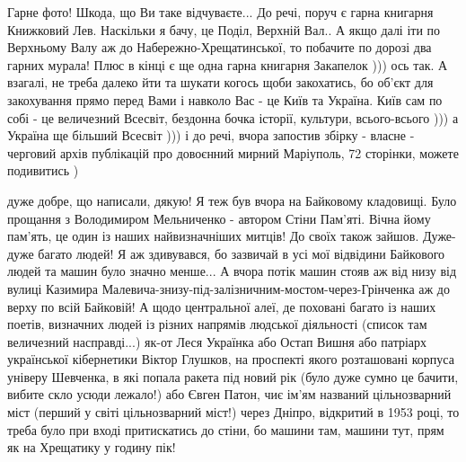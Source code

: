 Гарне фото! Шкода, що Ви таке відчуваєте... До речі, поруч є гарна книгарня
Книжковий Лев. Наскільки я бачу, це Поділ, Верхній Вал.. А якщо далі іти по
Верхньому Валу аж до Набережно-Хрещатинської, то побачите по дорозі два гарних
мурала! Плюс в кінці є ще одна гарна книгарня Закапелок ))) ось так. А взагалі,
не треба далеко йти та шукати когось щоби закохатись, бо об'єкт для закохування
прямо перед Вами і навколо Вас - це Київ та Україна. Київ сам по собі - це
величезний Всесвіт, бездонна бочка історії, культури, всього-всього ))) а
Україна ще більший Всесвіт ))) і до речі, вчора запостив збірку - власне -
черговий архів публікацій про довоєнний мирний Маріуполь, 72 сторінки, можете
подивитись )


дуже добре, що написали, дякую! Я теж був вчора на Байковому кладовищі. Було
прощання з Володимиром Мельниченко - автором Стіни Пам'яті. Вічна йому пам'ять,
це один із наших найвизначніших митців! До своїх також зайшов. Дуже-дуже багато
людей!  Я аж здивувався, бо зазвичай в усі мої відвідини Байкового людей та
машин було значно менше... А вчора потік машин стояв аж від низу від вулиці
Казимира Малевича-знизу-під-залізничним-мостом-через-Грінченка аж до верху по
всій Байковій! А щодо центральної алеї, де поховані багато із наших поетів,
визначних людей із різних напрямів людської діяльності (список там величезний
насправді...) як-от Леся Українка або Остап Вишня або патріарх української
кібернетики Віктор Глушков, на проспекті якого розташовані корпуса універу
Шевченка, в які попала ракета під новий рік (було дуже сумно це бачити, вибите
скло усюди лежало!) або Євген Патон, чиє ім'ям названий цільнозварний міст
(перший у світі цільнозварний міст!) через Дніпро, відкритий в 1953 році, то
треба було при вході притискатись до стіни, бо машини там, машини тут, прям як
на Хрещатику у годину пік!
